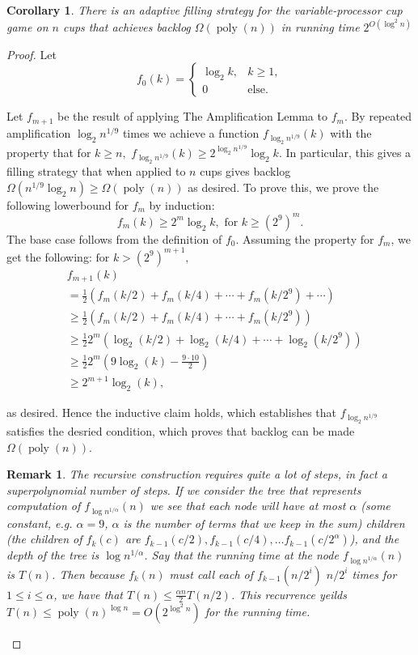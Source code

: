 \documentclass[twocolumn]{article}[11pt]
\DeclareMathOperator{\poly}{\text{poly}}
\newtheorem{remark}{Remark}
\newtheorem{corollary}{Corollary}
\begin{document}
\begin{corollary}
  \label{cor:adaptivePoly}
  There is an adaptive filling strategy for the variable-processor cup game on $n$ cups that achieves backlog $\Omega(\poly(n))$ in running time $2^{O(\log^2 n)}$
\end{corollary}
\begin{proof}
  Let
  $$f_0(k) = 
  \begin{cases} 
    \log_2 k, & k\geq 1, \\
    0 & \text{else.}
  \end{cases}$$

  Let $f_{m+1} $ be the result of applying The Amplification Lemma to $f_m$. 
  By repeated amplification $\log_2 n^{1/9}$ times we 
  achieve a function $f_{\log_2 n^{1/9}}(k)$ with the property that for $k \geq n,$
  $f_{\log_2 n^{1/9}}(k) \geq 2^{\log_2 n^{1/9}} \log_2 k$. In particular, this gives a filling strategy 
  that when applied to $n$ cups gives backlog $\Omega(n^{1/9}\log_2 n) \ge \Omega(\poly(n))$ as desired.
  To prove this, we prove the following lowerbound for $f_m$ by induction:
  $$f_m(k) \geq 2^m \log_2 k, \text{ for } k \geq (2^9)^m.$$
  The base case follows from the definition of $f_0$. Assuming the property for $f_m$, we get the following:
  $ \text{for } k > (2^9)^{m+1},$
  \begin{align*}
  &f_{m+1}(k) \\
  &= \frac{1}{2}(f_m(k/2) + f_m(k/4) + \cdots + f_m(k/2^9) + \cdots)\\
  &\geq \frac{1}{2}(f_m(k/2) + f_m(k/4) + \cdots + f_m(k/2^9))\\
  &\geq \frac{1}{2}2^m(\log_2 (k/2) + \log_2(k/4) + \cdots + \log_2(k/2^9))\\
  &\geq \frac{1}{2}2^m(9\log_2 (k) - \frac{9 \cdot 10}{2}) \\
  &\geq 2^{m+1} \log_2(k) ,
  \end{align*}

  as desired. Hence the inductive claim holds, which establishes that $f_{\log_2
  n^{1/9}}$ satisfies the desried condition, which proves that backlog can be
  made $\Omega(\poly(n))$.


  \begin{remark}
  The recursive construction requires quite a lot of steps, in fact a
  superpolynomial number of steps. If we consider the tree that represents
  computation of $f_{\log n^{1/\alpha}}(n)$ we see that each node will have at
  most $\alpha$ (some constant, e.g. $\alpha = 9$, $\alpha$ is the number of
  terms that we keep in the sum) children (the children of $f_k(c)$ are
  $f_{k-1}(c/2), f_{k-1}(c/4), \ldots f_{k-1}(c/2^\alpha)$), and the depth of
  the tree is $\log n^{1/\alpha}$. Say that the running time at the node
  $f_{\log n^{1/\alpha}}(n)$ is $T(n)$. Then because $f_{k}(n)$ must call each
  of $f_{k-1}(n/2^i)$ $n/2^i$ times for $1\le i \le \alpha$, we have that $
  T(n) \le \frac{\alpha n}{2}T(n/2)$. This recurrence yeilds $T(n) \le
  \poly(n)^{\log n} = O(2^{\log^2 n})$ for the running time.
  \end{remark}


\end{proof}
\end{document}
